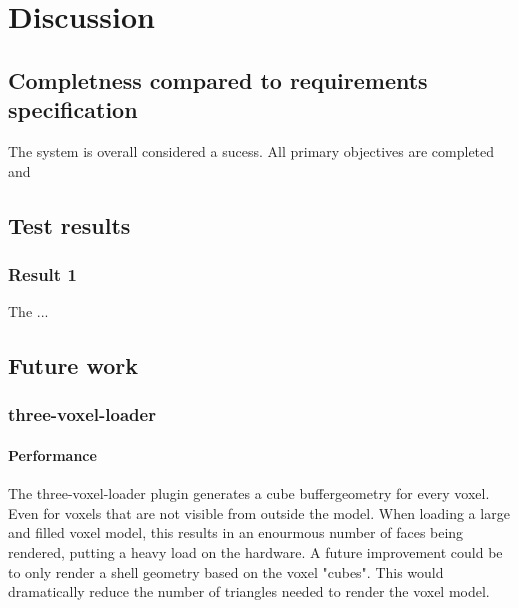 \chapter{Discussion}
\section{Completness compared to requirements specification}
The system is overall considered a sucess. All primary objectives are completed and 

\section{Test results}

\subsection{Result 1}\label{platformDesAndBuo}
The ...
\section{Future work}

\subsection{three-voxel-loader}
\subsubsection{Performance}

The three-voxel-loader plugin generates a cube buffergeometry for every voxel. Even for voxels that are not visible from outside the model. When loading a large and filled voxel model, this results in an enourmous number of faces being rendered, putting a heavy load on the hardware. A future improvement could be to only render a shell geometry based on the voxel "cubes". This would dramatically reduce the number of triangles needed to render the voxel model.



